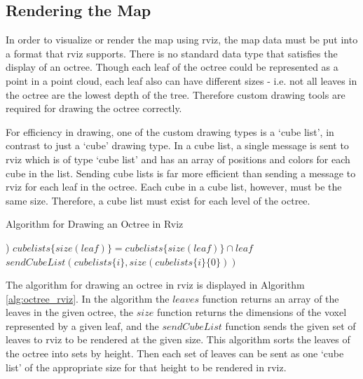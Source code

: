 \documentclass[12pt]{report}
\begin{document}
\subsection{Rendering the Map}\label{sec:rendering_the_map}
In order to visualize or render the map using rviz, the map data must be put into a format that rviz supports.  There is no standard data type that satisfies the display of an octree.  Though each leaf of the octree could be represented as a point in a point cloud, each leaf also can have different sizes - i.e. not all leaves in the octree are the lowest depth of the tree.  Therefore custom drawing tools are required for drawing the octree correctly.

For efficiency in drawing, one of the custom drawing types is a `cube list', in contrast to just a `cube' drawing type.  In a cube list, a single message is sent to rviz which is of type `cube list' and has an array of positions and colors for each cube in the list.  Sending cube lists is far more efficient than sending a message to rviz for each leaf in the octree.  Each cube in a cube list, however, must be the same size.  Therefore, a cube list must exist for each level of the octree.

\begin{algorithm}
\caption{Algorithm for Drawing an Octree in Rviz}
\label{alg:octree_rviz}
\begin{algorithmic}
  \STATE {}
  \STATE {})
    \STATE $cubelists\{size(leaf)\} = cubelists\{size(leaf)\} \cap leaf$
  \ENDFOR
    \STATE $sendCubeList(cubelists\{i\}, size(cubelists\{i\}\{0\}))$
  \ENDFOR
\end{algorithmic}
\end{algorithm}

The algorithm for drawing an octree in rviz is displayed in Algorithm \ref{alg:octree_rviz}.  In the algorithm the $leaves$ function returns an array of the leaves in the given octree, the $size$ function returns the dimensions of the voxel represented by a given leaf, and the $sendCubeList$ function sends the given set of leaves to rviz to be rendered at the given size.  This algorithm sorts the leaves of the octree into sets by height.  Then each set of leaves can be sent as one `cube list' of the appropriate size for that height to be rendered in rviz.
\end{document}
